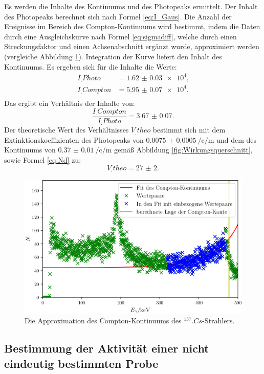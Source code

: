\newpage
\noindent Es werden die Inhalte des Kontinuums und des Photopeaks ermittelt. Der Inhalt des Photopeaks berechnet sich nach Formel \eqref{eq:I_Gaus}. Die Anzahl der Ereignisse im Bereich des Compton-Kontinuums wird bestimmt, indem die Daten durch eine Ausgleichskurve nach Formel \eqref{eq:sigmadiff}, welche durch einen Streckungsfaktor und einen Achsenabschnitt ergänzt wurde, approximiert werden (vergleiche Abbildung \ref{fig:Comptonkontinuum}). Integration der Kurve liefert den Inhalt des Kontinuums.
Es ergeben sich für die Inhalte die Werte:
\begin{align*}
I_.{Photo} 	 &= \num{1.62(3)e4}\text{,}\\
I_.{Compton} &= \num{5.95(7)e4}\text{.}\\
\end{align*} 
Das ergibt ein Verhältnis der Inhalte von:
\[
\frac{I_.{Compton}}{I_.{Photo}} = \num{3.67(7)}\text{.}
\]
Der theoretische Wert des Verhältnisses $V_.{theo}$ bestimmt sich mit dem Extinktionskoeffizienten des Photopeaks von $\SI{0.0075(5)}{\per\centi\per\metre}$ und dem des Kontinuums von $\SI{0.37(1)}{\per\centi\per\metre}$ gemäß Abbildung \ref{fig:Wirkungsquerschnitt}, sowie Formel \eqref{eq:Nd} zu: 
\[
V_.{theo} = \num{27(2)}\text{.}
\]

\begin{figure}
	\centering
	\includegraphics[width=\linewidth-70pt,height=\textheight-70pt,keepaspectratio]{content/images/Cs137Kon.png}
	\caption{Die Approximation des Compton-Kontinuums des $^{137}.{Cs}$-Strahlers.}
	\label{fig:Comptonkontinuum}
\end{figure}

\subsection{Bestimmung der Aktivität einer nicht eindeutig bestimmten Probe}

